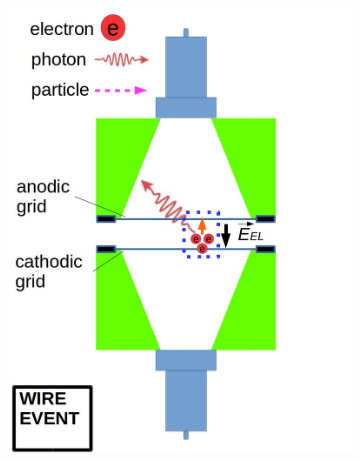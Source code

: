 \begin{figure}[!p]
	\centering
	\begin{subfigure}[b]{\halfwidth}
		\centering
		\includegraphics[width=\figurewidth,clip,trim={0 0 0 0},angle=0,origin=c]{Figures/GasTest/WeiDrawEvent/WirePhotoF.jpg}
		\caption{}
		\label{fig:ElectronEmissionPulse a}
	\end{subfigure}
	\begin{subfigure}[b]{\halfwidth}
		\centering

\end{subfigure}
\end{figure}
